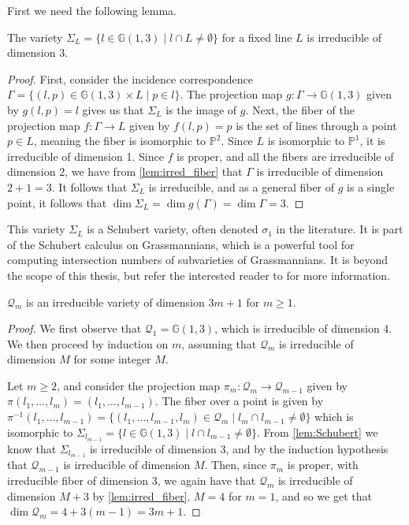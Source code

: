 First we need the following lemma.
\begin{lemma}\label{lem:Schubert}
    The variety $\Sigma_L = \{l \in \mathbb{G}(1,3) \mid l \cap L \neq \emptyset\}$ for a fixed line $L$ is irreducible of dimension 3.
\end{lemma}
\begin{proof}
    First, consider the incidence correspondence $\Gamma = \{(l, p) \in \mathbb{G}(1,3) \times L \mid p \in l\}$. The projection map $g \colon \Gamma \to \mathbb{G}(1,3)$ given by $g(l,p) = l$ gives us that $\Sigma_L$ is the image of $g$. Next, the fiber of the projection map $f \colon \Gamma \to L$ given by $f(l,p) = p$ is the set of lines through a point $p \in L$, meaning the fiber is isomorphic to $\mathbb{P}^2$. Since $L$ is isomorphic to $\mathbb{P}^1$, it is irreducible of dimension 1. Since $f$ is proper, and all the fibers are irreducible of dimension 2, we have from \cref{lem:irred_fiber} that $\Gamma$ is irreducible of dimension $2 + 1 = 3$. 
    It follows that $\Sigma_L$ is irreducible, and as a general fiber of $g$ is a single point, it follows that $\dim \Sigma_L = \dim g(\Gamma) = \dim \Gamma = 3$.
\end{proof}
\begin{remark}
    This variety $\Sigma_L$ is a Schubert variety, often denoted $\sigma_1$ in the literature. It is part of the Schubert calculus on Grassmannians, which is a powerful tool for computing intersection numbers of subvarieties of Grassmannians. It is beyond the scope of this thesis, but refer the interested reader to \cite[Section 3.3]{EH16} for more information.
\end{remark}

\begin{lemma} \label{lem:dimQm}
    $\mathcal{Q}_m$ is an irreducible variety of dimension $3m + 1$ for $m \geq 1$. 
\end{lemma} 

\begin{proof}
    We first observe that $\mathcal{Q}_1 = \mathbb{G}(1,3)$, which is irreducible of dimension 4. We then proceed by induction on $m$, assuming that $\mathcal{Q}_m$ is irreducible of dimension $M$ for some integer $M$.

    Let $m \geq 2$, and consider the projection map $\pi_m \colon \mathcal{Q}_m \to \mathcal{Q}_{m-1}$ given by $\pi(l_1, \dots, l_m) = (l_1, \dots, l_{m-1})$. The fiber over a point is given by $\pi^{-1}(l_1, \dots, l_{m-1}) = \{(l_1, \dots, l_{m-1}, l_m) \in \mathcal{Q}_m \mid l_m \cap l_{m-1} \neq \emptyset\}$ which is isomorphic to $\Sigma_{l_{m-1}} = \{l \in \mathbb{G}(1,3) \mid l \cap l_{m-1} \neq \emptyset\}$. From \cref{lem:Schubert} we know that $\Sigma_{l_{m-1}}$ is irreducible of dimension 3, and by the induction hypothesis that $\mathcal{Q}_{m-1}$ is irreducible of dimension $M$. Then, since $\pi_m$ is proper, with irreducible fiber of dimension 3, we again have that $\mathcal{Q}_m$ is irreducible of dimension $M + 3$ by \cref{lem:irred_fiber}. $M=4$ for $m=1$, and so we get that $\dim \mathcal{Q}_m = 4 + 3(m-1) = 3m + 1$. 
\end{proof}

